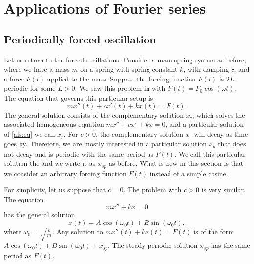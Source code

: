 
\sectionnewpage
\section{Applications of Fourier series}


\subsection{Periodically forced oscillation}

\begin{diffyfloatingfigure}{2.0in}{2.3in}
\noindent
{}
\end{diffyfloatingfigure}
Let us return to the forced oscillations.  Consider a mass-spring system as
before, where we have a mass $m$
on a spring with spring constant $k$,
with damping $c$, and a force $F(t)$ applied to the mass.  Suppose 
the forcing function $F(t)$ is $2L$-periodic for some $L > 0$.
We saw
this problem in  with $F(t) = F_0 \cos (\omega t)$.  The
equation that governs this particular setup is
\begin{equation} \label{afs:eq}
mx''(t) + cx'(t) + kx(t) = F(t) .
\end{equation}
The general solution consists of the complementary solution $x_c$, which
solves the associated homogeneous equation $mx'' + cx' + kx = 0$, and
a particular solution of \eqref{afs:eq} we call $x_p$.  For $c > 0$,
the complementary solution $x_c$ will decay as time goes by.
Therefore,
we are mostly interested
in a particular solution $x_p$ that does not decay
and is periodic with the same period as $F(t)$.  We call this particular
solution
the \emph{} and we write it as $x_{sp}$ as before.
What is new in this section is that we consider an arbitrary
forcing function $F(t)$ instead of a simple cosine.

For simplicity, let us suppose that $c=0$.  The problem with $c > 0$ is very
similar.
The equation
\begin{equation*}
mx'' + kx = 0 
\end{equation*}
has the general solution
\begin{equation*}
x(t) = A \cos (\omega_0 t) + 
B \sin (\omega_0 t) ,
\end{equation*}
where $\omega_0 = \sqrt{\frac{k}{m}}$.
Any solution to
$mx''(t) + kx(t) = F(t)$ is of the form
$A \cos (\omega_0 t) + B \sin (\omega_0 t) + x_{sp}$.
The steady
periodic solution $x_{sp}$ has the same period as $F(t)$.

